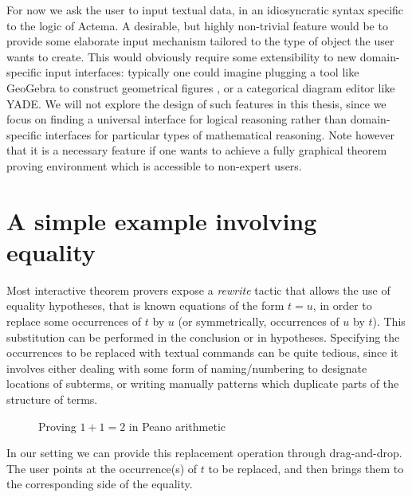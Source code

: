 For now we ask the user to input textual data, in an idiosyncratic syntax
specific to the logic of Actema. A desirable, but highly non-trivial feature
would be to provide some elaborate input mechanism tailored to the type of
object the user wants to create. This would obviously require some extensibility
to new domain-specific input interfaces: typically one could imagine plugging a
tool like GeoGebra to construct geometrical figures , or a
categorical diagram editor like YADE. We will not explore the design of such features in this thesis, since we
focus on finding a universal interface for logical reasoning rather than
domain-specific interfaces for particular types of mathematical
reasoning. Note however that it
is a necessary feature if one wants to achieve a fully graphical theorem proving
environment which is accessible to non-expert users.

\section{A simple example involving equality}

Most interactive theorem provers expose a \emph{rewrite} tactic that allows the
use of equality hypotheses, that is known equations of the form $t = u$, in
order to replace some occurrences of $t$ by $u$ (or symmetrically, occurrences
of $u$ by $t$). This substitution can be performed in the conclusion or in
hypotheses. Specifying the occurrences to be replaced with textual commands can
be quite tedious, since it involves either dealing with some form of
naming/numbering to designate locations of subterms, or writing manually
patterns which duplicate parts of the structure of terms.

\begin{figure*}
  \begin{center}
  \end{center}
  \caption{Proving $1 + 1 = 2$ in Peano arithmetic}
\end{figure*}

In our setting we can provide this replacement operation through
drag-and-drop. The user points at the occurrence(s) of $t$ to be
replaced, and then brings them to the corresponding side of the
equality.

